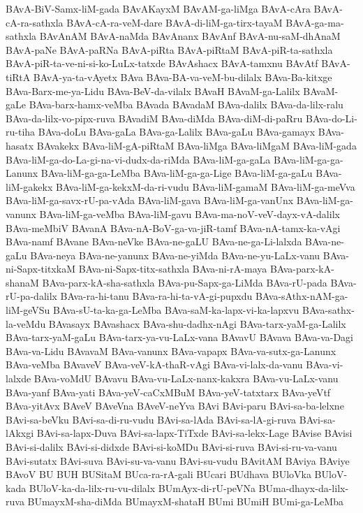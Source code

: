 {BAvA-BiV-Samx-liM-gada
BAvAKayxM
BAvAM-ga-liMga
BAvA-cAra
BAvA-cA-ra-sathxla
BAvA-cA-ra-veM-dare
BAvA-di-liM-ga-tirx-tayaM
BAvA-ga-ma-sathxla
BAvAnAM
BAvA-naMda
BAvAnanx
BAvAnf
BAvA-nu-saM-dhAnaM
BAvA-paNe
BAvA-paRNa
BAvA-piRta
BAvA-piRtaM
BAvA-piR-ta-sathxla
BAvA-piR-ta-ve-ni-si-ko-LuLx-tatxde
BAvAshacx
BAvA-tamxnu
BAvAtf
BAvA-tiRtA
BAvA-ya-ta-vAyetx
BAva
BAva-BA-va-veM-bu-dilalx
BAva-Ba-kitxge
BAva-Barx-me-ya-Lidu
BAva-BeV-da-vilalx
BAvaH
BAvaM-ga-Lalilx
BAvaM-gaLe
BAva-barx-hamx-veMba
BAvada
BAvadaM
BAva-dalilx
BAva-da-lilx-ralu
BAva-da-lilx-vo-pipx-ruva
BAvadiM
BAva-diMda
BAva-diM-di-paRru
BAva-do-Li-ru-tiha
BAva-doLu
BAva-gaLa
BAva-ga-Lalilx
BAva-gaLu
BAva-gamayx
BAva-hasatx
BAvakekx
BAva-liM-gA-piRtaM
BAva-liMga
BAva-liMgaM
BAva-liM-gada
BAva-liM-ga-do-La-gi-na-vi-dudx-da-riMda
BAva-liM-ga-gaLa
BAva-liM-ga-ga-Lanunx
BAva-liM-ga-ga-LeMba
BAva-liM-ga-ga-Lige
BAva-liM-ga-gaLu
BAva-liM-gakekx
BAva-liM-ga-kekxM-da-ri-vudu
BAva-liM-gamaM
BAva-liM-ga-meVva
BAva-liM-ga-savx-rU-pa-vAda
BAva-liM-gava
BAva-liM-ga-vanUnx
BAva-liM-ga-vanunx
BAva-liM-ga-veMba
BAva-liM-gavu
BAva-ma-noV-veV-dayx-vA-dalilx
BAva-meMbiV
BAvanA
BAva-nA-BoV-ga-va-jiR-tamf
BAva-nA-tamx-ka-vAgi
BAva-namf
BAvane
BAva-neVke
BAva-ne-gaLU
BAva-ne-ga-Li-lalxda
BAva-ne-gaLu
BAva-neya
BAva-ne-yanunx
BAva-ne-yiMda
BAva-ne-yu-LaLx-vanu
BAva-ni-Sapx-titxkaM
BAva-ni-Sapx-titx-sathxla
BAva-ni-rA-maya
BAva-parx-kA-shanaM
BAva-parx-kA-sha-sathxla
BAva-pu-Sapx-ga-LiMda
BAva-rU-pada
BAva-rU-pa-dalilx
BAva-ra-hi-tanu
BAva-ra-hi-ta-vA-gi-pupxdu
BAva-sAthx-nAM-ga-liM-geVSu
BAva-sU-ta-ka-ga-LeMba
BAva-saM-ka-lapx-vi-ka-lapxvu
BAva-sathx-la-veMdu
BAvasayx
BAvashacx
BAva-shu-dadhx-nAgi
BAva-tarx-yaM-ga-Lalilx
BAva-tarx-yaM-gaLu
BAva-tarx-ya-vu-LaLx-vana
BAvavU
BAvava
BAva-va-Dagi
BAva-va-Lidu
BAvavaM
BAva-vanunx
BAva-vapapx
BAva-va-sutx-ga-Lanunx
BAva-veMba
BAvaveV
BAva-veV-kA-thaR-vAgi
BAva-vi-lalx-da-vanu
BAva-vi-lalxde
BAva-voMdU
BAvavu
BAva-vu-LaLx-nanx-kakxra
BAva-vu-LaLx-vanu
BAva-yanf
BAva-yati
BAva-yeV-caCxMBuM
BAva-yeV-tatxtarx
BAva-yeVtf
BAva-yitAvx
BAveV
BAveVna
BAveV-neYva
BAvi
BAvi-paru
BAvi-sa-ba-lelxne
BAvi-sa-beVku
BAvi-sa-di-ru-vudu
BAvi-sa-lAda
BAvi-sa-lA-gi-ruva
BAvi-sa-lAkxgi
BAvi-sa-lapx-Duva
BAvi-sa-lapx-TiTxde
BAvi-sa-lekx-Lage
BAvise
BAvisi
BAvi-si-dalilx
BAvi-si-didxde
BAvi-si-koMDu
BAvi-si-ruva
BAvi-si-ru-va-vanu
BAvi-sutatx
BAvi-suva
BAvi-su-va-vanu
BAvi-su-vudu
BAvitAM
BAviya
BAviye
BAvoV
BU
BUH
BUSitaM
BUca-ra-rA-gali
BUcari
BUdhava
BUloVka
BUloV-kada
BUloV-ka-da-lilx-ru-vu-dilalx
BUmAyx-di-rU-peVNa
BUma-dhayx-da-lilx-ruva
BUmayxM-sha-diMda
BUmayxM-shataH
BUmi
BUmiH
BUmi-ga-LeMba
}
